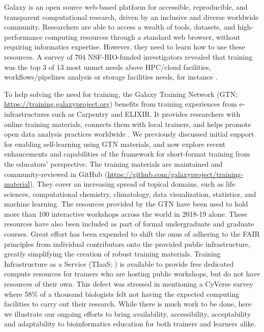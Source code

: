 \documentclass[10pt,letterpaper]{article}
\begin{document}
Galaxy \cite{Jalili2020} is an open source web-based platform for accessible, reproducible, and transparent computational research, driven by an inclusive and diverse worldwide community.
Researchers are able to access a wealth of tools, datasets, and high-performance computing resources through a standard web browser, without requiring informatics expertise. However, they need to learn how to use these resources. A survey of 704 NSF-BIO-funded investigators revealed that training was the top 3 of 13 most unmet needs above HPC/cloud facilities, workflows/pipelines analysis or storage facilities needs, for instance \cite{Barone2017}.

To help solving the need for training, the Galaxy Training Network (GTN; \url{https://training.galaxyproject.org}) benefits from training experiences from e-infrastructures such as Carpentry and ELIXIR. It provides researchers with online training materials, connects them with local trainers, and helps promote open data analysis practices worldwide \cite{Batut2018}. We previously discussed initial support for enabling self-learning using GTN materials, and now explore recent enhancements and capabilities of the framework for short-format training from the educators’ perspective.
The training materials are maintained and community-reviewed in GitHub (\url{https://github.com/galaxyproject/training-material}). They cover an increasing spread of topical domains, such as life sciences, computational chemistry, climatology, data visualization, statistics, and machine learning. 
The resources provided by the GTN have been used to hold more than 100 interactive workshops across the world in 2018-19 alone.
These resources have also been included as part of formal undergraduate and graduate courses. Great effort has been expended to shift the onus of adhering to the FAIR principles \cite{Wilkinson2016} from individual contributors onto the provided public infrastructure, greatly simplifying the creation of robust training materials.
Training Infrastructure as a Service (TIaaS; \cite{Rasche2020}) is available to provide free dedicated compute resources for trainers who are hosting public workshops, but do not have resources of their own. This defect was stressed in \cite{Barone2017} mentioning a CyVerse survey where 58\% of a thousand biologists felt not having the expected computing facilities to carry out their research.
While there is much work to be done, here we illustrate our ongoing efforts to bring availability, accessibility, acceptability and adaptability to bioinformatics education for both trainers and learners alike.
\end{document}
